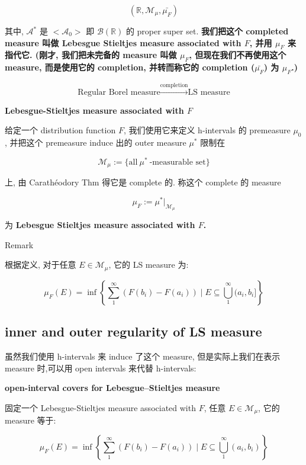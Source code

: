 \documentclass{qlnotes-export}
\begin{document}
\[({\mathbb{R}},\mathcal{M}_{\mu},\bar{\mu_{F}})\]

其中, \(\mathcal{A}^{\ast}\) 是 \(< \mathcal{A}_{0} >\) 即 \(\mathcal{B}({\mathbb{R}})\) 的 proper super set. \textbf{我们把这个 completed measure 叫做 Lebesgue Stieltjes measure associated with \(F\), 并用 \(\mu_{F}\) 来指代它. (刚才, 我们把未完备的 measure 叫做 \(\mu_{F}\), 但现在我们不再使用这个 measure, 而是使用它的 completion, 并转而称它的 completion (\(\bar{\mu_{F}}\)) 为 \(\mu_{F}\).)}

\[\text{Regular Borel measure}\overset{\text{completion}}{\rightarrow}\text{LS measure}\]

\begin{definition}{\protect{}\label{kn-lebesgue-stieltjes-measure-associated-with-f}{\textbf{Lebesgue-Stieltjes
measure associated with \(F\)}}}

给定一个 distribution function \(F\), 我们使用它来定义 h-intervals 的 premeasure \(\mu_{0}\), 并把这个 premeasure induce 出的 outer measure \(\mu^{\ast}\) 限制在

\[\mathcal{M}_{\mu} := \{\text{all}\ \mu^{\ast}\ \text{-measurable set\}}\]

上, 由 Carathéodory Thm 得它是 complete 的. 称这个 complete 的 measure

\[\mu_{F} := \mu^{\ast}|_{\mathcal{M}_{\mu}}\]

为 \textbf{Lebesgue Stieltjes measure associated with \(F\).}

\end{definition}

\begin{qlremark}{Remark}

根据定义, 对于任意 \(E \in \mathcal{M}_{\mu}\), 它的 LS measure 为:

\[\mu_{F}(E) = \inf\left\{ {\sum\limits_{1}^{\infty}(F(b_{i}) - F(a_{i})) \mid E \subseteq \bigcup\limits_{1}^{\infty}(a_{i},b_{i}\rbrack} \right\}\]

\end{qlremark}

\subsection{inner and outer regularity of LS measure}\label{inner-and-outer-regularity-of-ls-measure}

虽然我们使用 h-intervals 来 induce 了这个 measure, 但是实际上我们在表示 measure 时,可以用 open intervals 来代替 h-intervals:

\begin{lemma}{\protect{}\label{kn-open-interval-covers-for-lebesgue-stieltjes-measure}{\textbf{open-interval
covers for Lebesgue--Stieltjes measure}}}

固定一个 Lebesgue-Stieltjes measure associated with \(F\), 任意 \(E \in \mathcal{M}_{\mu}\), 它的 measure 等于:

\[\mu_{F}(E) = \inf\left\{ {\sum\limits_{1}^{\infty}(F(b_{i}) - F(a_{i})) \mid E \subseteq \bigcup\limits_{1}^{\infty}(a_{i},b_{i})} \right\}\]

\end{lemma}
\end{document}
